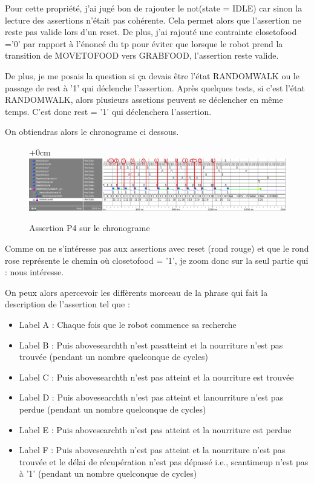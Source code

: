 \documentclass{article}
\newcommand{\sautligne}{
\textbf{\vspace{5mm}}
}
\begin{document}
\begin{landscape}
Pour cette propriété, j'ai jugé bon de rajouter le not(state = IDLE) car sinon la lecture des assertions n'était pas cohérente. Cela permet alors que l'assertion ne reste pas valide lors d'un reset. 
De plus, j'ai rajouté une contrainte closetofood ='0' par rapport à l'énoncé du tp pour éviter que lorsque le robot prend la transition de MOVETOFOOD vers GRABFOOD, l'assertion reste valide.
\sautligne

De plus, je me posais la question si ça devais être l'état RANDOMWALK ou le passage de rest à '1' qui déclenche l'assertion. Après quelques tests, si c'est l'état RANDOMWALK, alors plusieurs assetions peuvent se déclencher en même temps. C'est donc rest = '1' qui déclenchera l'assertion.

On obtiendras alors le chronograme ci dessous. 

\begin{figure}[!h]
\advance\leftskip+0cm
\includegraphics[scale=0.6]{PSL/P4-1.PNG}
\caption{Assertion P4 sur le chronograme }
\end{figure}

Comme on ne s'intéresse pas aux assertions avec reset (rond rouge) et que le rond rose représente le chemin où closetofood = '1', je zoom donc sur la seul partie qui : nous intéresse.

On peux alors apercevoir les diffèrents morceau de la phrase qui fait la description de l'assertion tel que :
\begin{itemize}
\item Label A : Chaque fois que le robot commence sa recherche
\item Label B : Puis abovesearchth n'est pasatteint et la nourriture n'est pas trouvée (pendant un nombre quelconque de cycles)
\item Label C : Puis abovesearchth n'est pas atteint et la nourriture est trouvée
\item Label D : Puis abovesearchth n'est pas atteint et lanourriture n'est pas perdue (pendant un nombre quelconque de cycles)
\item Label E : Puis abovesearchth n'est pas atteint et la nourriture est perdue
\item Label F : Puis abovesearchth n'est pas atteint et la nourriture n'est pas trouvée et le délai de récupération n'est pas dépassé i.e., scantimeup n'est pas à '1' (pendant un
nombre quelconque de cycles)


\end{itemize}
\end{landscape}
\end{document}
